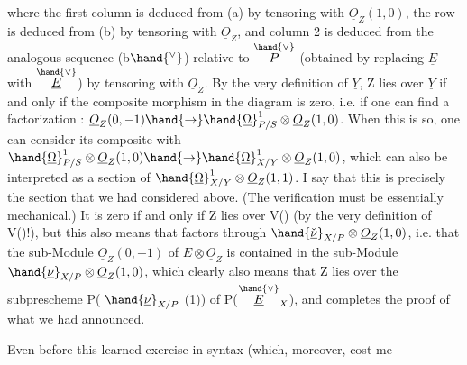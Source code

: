 where the first column is deduced from (a) by tensoring with $\underline{O}_Z(1,0)$,
the row is deduced from (b) by tensoring with $\underline{O}_Z$, and column 2
is deduced from the  analogous  sequence (b$\hand{^\vee}$) relative to $\overset{\hand{\vee}}{P}$ (obtained
by replacing $\underline{E}$ with $\overset{\hand{\vee}}{\underline{E}}$) by tensoring with $\underline{O}_Z$. By the very definition
of $\underline{Y}$, Z lies over $\underline{Y}$ if and only if the composite
morphism \hand{$\alpha$} in the diagram is zero, i.e. if one can find a factorization
\hand{$\beta$}: $\underline{O}_Z(0,-1) \hand{\rightarrow} \hand{\underline{\Omega}}^1_{P/S}\otimes \underline{O}_Z(1,0)$. When this is so, one can
consider its composite with $\hand{\underline{\Omega}}^1_{P/S} \otimes \underline{O}_Z(1,0) \hand{\rightarrow} \hand{\underline{\Omega}}^1_{X/Y} \otimes \underline{O}_Z(1,0)$,
which can also be interpreted as a section of $\hand{\underline{\Omega}}^1_{X/Y}\otimes \underline{O}_Z(1,1)$.
I say that this is precisely the section  that we had considered above.
(The verification must be essentially mechanical.) It is
zero if and only if Z lies over V(\hand{$\mu$}) (by the very definition
of V(\hand{$\mu$})!), but this also means that \hand{$\beta$} factors through
$\hand{\check{\underline{\nu}}}_{X/P} \otimes \underline{O}_Z(1,0)$, i.e. that the sub-Module $\underline{O}_Z(0,-1)$ of $E\otimes \underline{O}_Z$ is contained
in the sub-Module $\hand{\underline{\nu}}_{X/P} \otimes \underline{O}_Z(1,0)$, which clearly also means
that Z lies over the subprescheme P( $\hand{\underline{\nu}}_{X/P}$ (1)) of P($\overset{\hand{\vee}}{\underline{E}}_X$), and
completes the proof of what we had announced.

Even before this learned exercise in syntax (which, moreover, cost me

